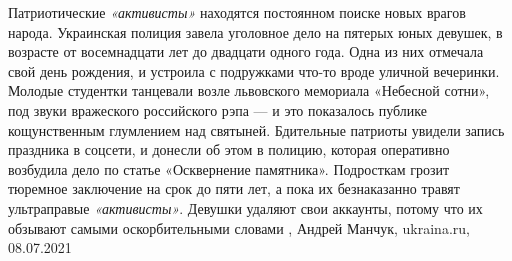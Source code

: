 Патриотические \emph{«активисты»} находятся постоянном поиске новых врагов
народа.  Украинская полиция завела уголовное дело на пятерых юных девушек, в
возрасте от восемнадцати лет до двадцати одного года. Одна из них отмечала свой
день рождения, и устроила с подружками что-то вроде уличной вечеринки. Молодые
студентки танцевали возле львовского мемориала «Небесной сотни», под звуки
вражеского российского рэпа — и это показалось публике кощунственным глумлением
над святыней.  Бдительные патриоты увидели запись праздника в соцсети, и
донесли об этом в полицию, которая оперативно возбудила дело по статье
«Осквернение памятника».  Подросткам грозит тюремное заключение на срок до пяти
лет, а пока их безнаказанно травят ультраправые \emph{«активисты»}. Девушки удаляют
свои аккаунты, потому что их обзывают самыми оскорбительными словами
, 
Андрей Манчук, ukraina.ru, 08.07.2021

